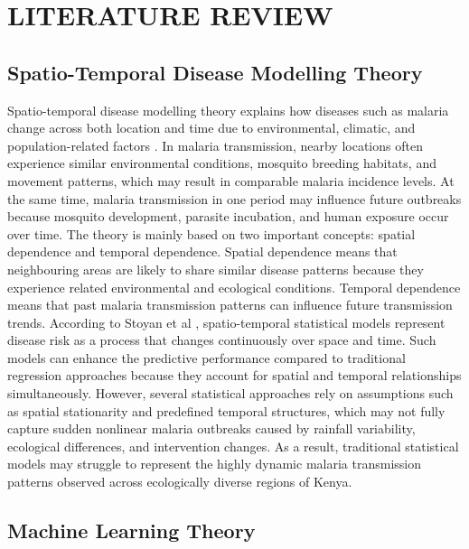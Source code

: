 
\chapter{LITERATURE REVIEW}

\section{Spatio-Temporal Disease Modelling Theory}



Spatio-temporal disease modelling theory explains how diseases such as malaria change across both location and time due to environmental, climatic, and population-related factors \cite{Cressie1993}. In malaria transmission, nearby locations often experience similar environmental conditions, mosquito breeding habitats, and movement patterns, which may result in comparable malaria incidence levels. At the same time, malaria transmission in one period may influence future outbreaks because mosquito development, parasite incubation, and human exposure occur over time. The theory is mainly based on two important concepts: spatial dependence and temporal dependence. Spatial dependence means that neighbouring areas are likely to share similar disease patterns because they experience related environmental and ecological conditions. Temporal dependence means that past malaria transmission patterns can influence future transmission trends. According to Stoyan et al \cite{Stoyan2014Statistical}, spatio-temporal statistical models represent disease risk as a process that changes continuously over space and time. Such models can enhance the predictive performance  compared to traditional regression approaches because they account for spatial and temporal relationships simultaneously. However, several statistical approaches rely on assumptions such as spatial stationarity and predefined temporal structures, which may not fully capture sudden nonlinear malaria outbreaks caused by rainfall variability, ecological differences, and intervention changes. As a result, traditional statistical models may struggle to represent the highly dynamic malaria transmission patterns observed across ecologically diverse regions of Kenya.
\section{Machine Learning Theory}


